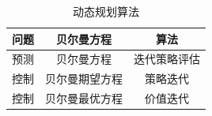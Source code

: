 \begin{table}[h]
  \caption{动态规划算法}
  \label{tab:mdp_summary}
  \centering
  \begin{tabular}{ccc}
  \toprule
  问题 & 贝尔曼方程   & 算法      \\ \hline
  预测 & 贝尔曼方程 & 迭代策略评估 \\ 
  控制 & 贝尔曼期望方程 & 策略迭代    \\ 
  控制 & 贝尔曼最优方程 & 价值迭代    \\ 
  \bottomrule
  \end{tabular}
  \end{table}













